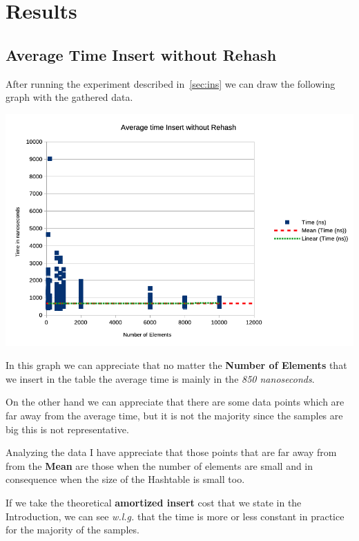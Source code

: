\documentclass[12pt, a4paper]{article}
\begin{document}
\section{Results}
\subsection{Average Time Insert without Rehash}
After running the experiment described in~\ref{sec:ins} we can draw the following graph with the gathered data.

  \begin{minipage}[t]{\linewidth}
    \includegraphics[width=\textwidth]{insert_without_rehash}
    \label{fig:ins_rehash}
  \end{minipage}

  In this graph we can appreciate that no matter the \textbf{Number of Elements} that we insert in the table the average time is mainly in the
  \textit{850 nanoseconds}.

  On the other hand we can appreciate that there are some data points which are far away from the average time, but it is not the majority since the samples are big this is not representative.

  Analyzing the data I have appreciate that those points that are far away from from the \textbf{Mean} are those when the number of elements are small and in consequence when the size of the Hashtable is small too.

  If we take the theoretical \textbf{amortized insert} cost that we state in the Introduction, we can see \textit{w.l.g.} that the time is more or less constant in practice for the majority of the samples.
\end{document}
